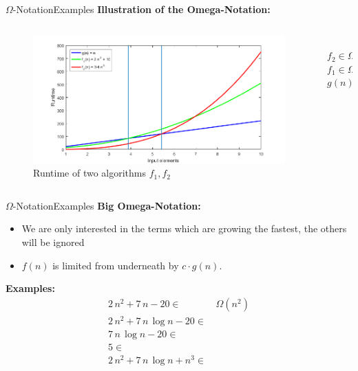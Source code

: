 \begin{frame}{$\Omega$-Notation}{Examples}
  \textbf{Illustration of the Omega-Notation:}\\[-1.0em]
  \begin{columns}
    \begin{column}{0.9\textwidth}
      \begin{figure}[!h]
        \includegraphics[width=\linewidth]{Images/OmegaNotationRuntime.png}
        \caption{Runtime of two algorithms $f_1, f_2$}
        \label{fig:omega_o_runtime_example}
      \end{figure}
    \end{column}
    \begin{column}{0.1\textwidth}
      \vspace{-4.75em}\\
      \hspace*{-2.5em}$f_2 \in \Omega(g)$\\[2.0em]
      \hspace*{-2.5em}$f_1 \in \Omega(g)$\\[2.5em]
      \hspace*{-2.5em}$g(n)$
    \end{column}
  \end{columns}
\end{frame}


\begin{frame}{$\Omega$-Notation}{Examples}
  \textbf{Big Omega-Notation:}
  \begin{itemize}
    \item
      We are only interested in the terms which are growing the fastest, the
      others will be ignored
    \item
      $f(n)$ is limited {\color{Mittel-Blau}from underneath} by
      $c \cdot g(n)$.\\
  \end{itemize}
  \textbf{Examples:}
  \begin{align*}
    2 \, n^2 + 7 \, n - 20 \in & \,\Omega(n^2)\\
    2 \, n^2 + 7 \, n \, \log n - 20 \in & {}\\
    7 \, n \, \log n - 20 \in & {}\\
    5 \in & {}\\
    2 \, n^2 + 7 \, n \, \log n + n^3 \in & {}
  \end{align*}
\end{frame}

